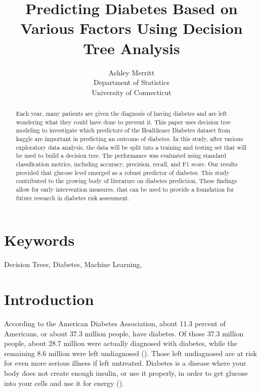 \documentclass[12pt]{article}
\title{Predicting Diabetes Based on Various Factors Using Decision Tree Analysis}
\author{Ashley Merritt\\
    Department of Statistics\\
    University of Connecticut
    }
\begin{document}
\maketitle

\begin{abstract}
Each year, many patients are given the diagnosis of having diabetes and are left wondering what they could have done to prevent it. This
paper uses decision tree modeling to investigate which predictors of the Healthcare Diabetes dataset from kaggle are important in predicting 
an outcome of diabetes. In this study, after various exploratory data analysis, the data will be split into a training and testing set
that will be used to build a decision tree. The performance was evaluated using standard classification metrics, including accuracy, precision, 
recall, and F1 score. Our results provided that glucose level emerged as a robust predictor of diabetes. This study contributed to the growing body of
literature on diabetes prediction. These findings allow for early intervention measures, that can be used to provide a foundation for future research in diabetes
risk assessment.
\end{abstract}

\section*{Keywords}
Decision Trees, Diabetes, Machine Learning, 

\section{Introduction}
\label{sec:intro}
    According to the American Diabetes Association, about 11.3 percent of Americans, or about 37.3 million people, have diabetes.
    Of those 37.3 million people, about 28.7 million were actually diagnosed with diabetes, while the remaining 8.6 million were
    left undiagnosed (\citet{CDC2022Diabetes}). Those left undiagnosed are at risk for even more serious illness if left untreated. 
    Diabetes is a disease where your body does not create enough insulin, or use it properly, in order to get glucose into your cells 
    and use it for energy (\cite{NIH2023Whatis}).
    
\end{document}
